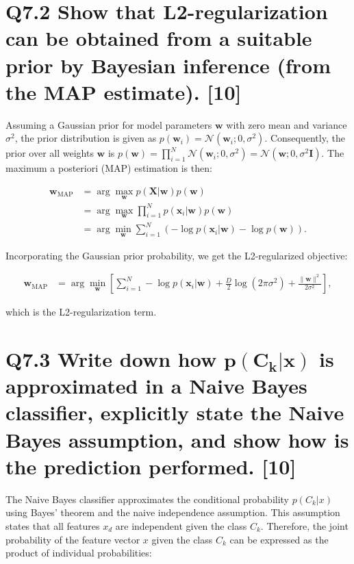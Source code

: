 \documentclass[11pt]{article}
\begin{document}
\section{Q7.2 Show that L2-regularization can be obtained from a suitable prior by Bayesian inference (from the MAP estimate). [10]}

Assuming a Gaussian prior for model parameters $\mathbf{w}$ with zero mean and variance $\sigma^2$, the prior distribution is given as $p(\mathbf{w}_i) = \mathcal{N}(\mathbf{w}_i; 0, \sigma^2)$. Consequently, the prior over all weights $\mathbf{w}$ is $p(\mathbf{w}) = \prod_{i=1}^N \mathcal{N}(\mathbf{w}_i; 0, \sigma^2) = \mathcal{N}(\mathbf{w}; 0, \sigma^2 \mathbf{I})$. The maximum a posteriori (MAP) estimation is then:

\begin{align*}
\mathbf{w}_{\text{MAP}} &= \arg \max_{\mathbf{w}} p(\mathbf{X} | \mathbf{w})p(\mathbf{w}) \\
&= \arg \max_{\mathbf{w}} \prod_{i=1}^N p(\mathbf{x}_i | \mathbf{w})p(\mathbf{w}) \\
&= \arg \min_{\mathbf{w}} \sum_{i=1}^N \left( -\log p(\mathbf{x}_i | \mathbf{w}) - \log p(\mathbf{w}) \right).
\end{align*}

Incorporating the Gaussian prior probability, we get the L2-regularized objective:

\begin{align*}
\mathbf{w}_{\text{MAP}} &= \arg \min_{\mathbf{w}} \left[ \sum_{i=1}^N -\log p(\mathbf{x}_i | \mathbf{w}) + \frac{D}{2} \log(2\pi\sigma^2) + \frac{\| \mathbf{w} \|^2}{2\sigma^2} \right],
\end{align*}

which is the L2-regularization term.

\section{Q7.3 Write down how $\mathbf{p(C_k|x)}$ is approximated in a Naive Bayes classifier, explicitly state the Naive Bayes assumption, and show how is the prediction performed. [10]}

The Naive Bayes classifier approximates the conditional probability \( p(C_k | x) \) using Bayes' theorem and the naive independence assumption. This assumption states that all features \( x_d \) are independent given the class \( C_k \). Therefore, the joint probability of the feature vector \( x \) given the class \( C_k \) can be expressed as the product of individual probabilities:
\end{document}
